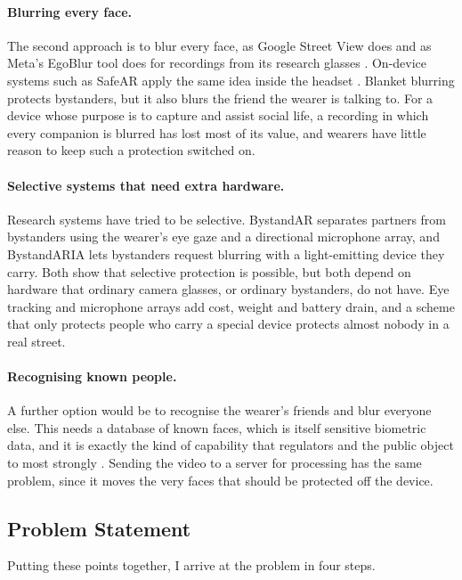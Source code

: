 \paragraph{Blurring every face.}
The second approach is to blur every face, as Google Street View does and as Meta's
EgoBlur tool does for recordings from its research glasses \cite{egoblur2023}. On-device
systems such as SafeAR apply the same idea inside the headset \cite{safear2025}. Blanket
blurring protects bystanders, but it also blurs the friend the wearer is talking to. For a
device whose purpose is to capture and assist social life, a recording in which every
companion is blurred has lost most of its value, and wearers have little reason to keep
such a protection switched on.

\paragraph{Selective systems that need extra hardware.}
Research systems have tried to be selective. BystandAR \cite{bystandar} separates
partners from bystanders using the wearer's eye gaze and a directional microphone array,
and BystandARIA \cite{bystandaria} lets bystanders request blurring with a light-emitting
device they carry. Both show that selective protection is possible, but both depend on
hardware that ordinary camera glasses, or ordinary bystanders, do not have. Eye tracking
and microphone arrays add cost, weight and battery drain, and a scheme that only protects
people who carry a special device protects almost nobody in a real street.

\paragraph{Recognising known people.}
A further option would be to recognise the wearer's friends and blur everyone else. This
needs a database of known faces, which is itself sensitive biometric data, and it is
exactly the kind of capability that regulators and the public object to most strongly
\cite{cox2024ixray,cbs2026texas}. Sending the video to a server for processing has the
same problem, since it moves the very faces that should be protected off the device.

\subsection{Problem Statement}
\label{sec:problem}

Putting these points together, I arrive at the problem in four steps.

